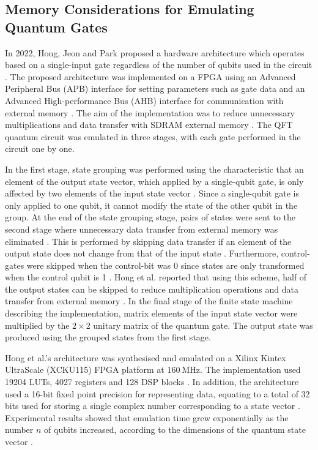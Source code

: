 \subsection{Memory Considerations for Emulating Quantum Gates}

In 2022, Hong, Jeon and Park proposed a hardware architecture which operates based on a single-input gate regardless of the number of qubits used in the circuit \cite{hong2022quantum}. The proposed architecture was implemented on a FPGA using an Advanced Peripheral Bus (APB) interface for setting parameters such as gate data and an Advanced High-performance Bus (AHB) interface for communication with external memory \cite{hong2022quantum}. The aim of the implementation was to reduce unnecessary multiplications and data transfer with SDRAM external memory \cite{hong2022quantum}. The QFT quantum circuit was emulated in three stages, with each gate performed in the circuit one by one. 

In the first stage, state grouping was performed using the characteristic that an element of the output state vector, which applied by a single-qubit gate, is only affected by two elements of the input state vector \cite{hong2022quantum}. Since a single-qubit gate is only applied to one qubit, it cannot modify the state of the other qubit in the group. At the end of the state grouping stage, pairs of states were sent to the second stage where unnecessary data transfer from external memory was eliminated \cite{hong2022quantum}. This is performed by skipping data transfer if an element of the output state does not change from that of the input state \cite{hong2022quantum}. Furthermore, control-gates were skipped when the control-bit was 0 since states are only transformed when the control qubit is 1 \cite{hong2022quantum}. Hong et al. reported that using this scheme, half of the output states can be skipped to reduce multiplication operations and data transfer from external memory \cite{hong}. In the final stage of the finite state machine describing the implementation, matrix elements of the input state vector were multiplied by the $2\times2$ unitary matrix of the quantum gate. The output state was produced using the grouped states from the first stage. 

Hong et al.'s architecture was synthesised and emulated on a Xilinx Kintex UltraScale (XCKU115) FPGA platform at $\SI{160}{\mega\hertz}$. The implementation used 19204 LUTs, 4027 registers and 128 DSP blocks \cite{hong2022quantum}. In addition, the architecture used a 16-bit fixed point precision for representing data, equating to a total of 32 bits used for storing a single complex number corresponding to a state vector \cite{hong2022quantum}. Experimental results showed that emulation time grew exponentially as the number $n$ of qubits increased, according to the dimensions of the quantum state vector \cite{hong2022quantum}. 

